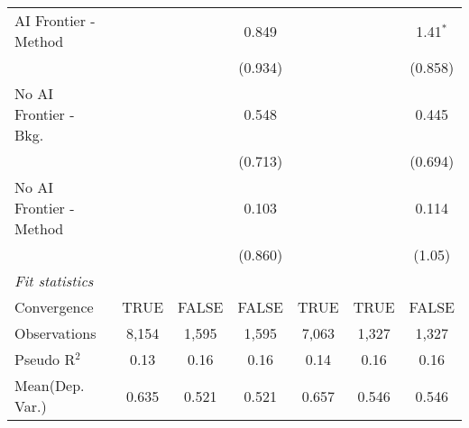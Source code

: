 \begin{tabular}{lcccccc}
   AI Frontier - Method    &               &              & 0.849       &               &              & 1.41$^{*}$\\   
                           &               &              & (0.934)     &               &              & (0.858)\\   
   No AI Frontier - Bkg.   &               &              & 0.548       &               &              & 0.445\\   
                           &               &              & (0.713)     &               &              & (0.694)\\   
   No AI Frontier - Method &               &              & 0.103       &               &              & 0.114\\   
                           &               &              & (0.860)     &               &              & (1.05)\\   
   \midrule
   \emph{Fit statistics}\\
   Convergence             &TRUE           & FALSE        & FALSE       & TRUE          & TRUE         & FALSE\\  
   Observations            & 8,154         & 1,595        & 1,595       & 7,063         & 1,327        & 1,327\\  
   Pseudo R$^2$            & 0.13          & 0.16         & 0.16        & 0.14          & 0.16         & 0.16\\  
Mean(Dep. Var.) & 0.635 & 0.521 & 0.521 & 0.657 & 0.546 & 0.546 \\
   

\end{tabular}
